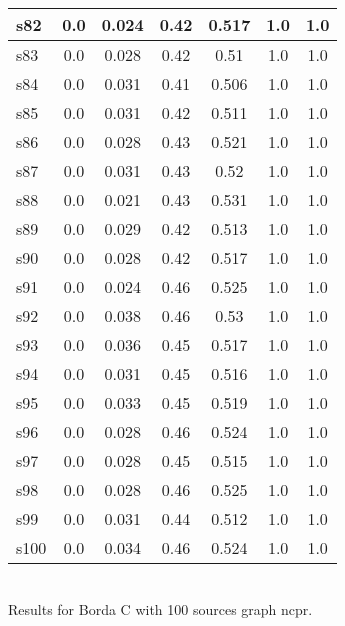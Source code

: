 \documentclass{article}
\begin{document}
\begin{tabular}{|l|c|c|c|c|c|c|}
\hline
s82 &0.0 & 0.024 & 0.42 & 0.517 & 1.0 & 1.0\\
\hline
s83 &0.0 & 0.028 & 0.42 & 0.51 & 1.0 & 1.0\\
\hline
s84 &0.0 & 0.031 & 0.41 & 0.506 & 1.0 & 1.0\\
\hline
s85 &0.0 & 0.031 & 0.42 & 0.511 & 1.0 & 1.0\\
\hline
s86 &0.0 & 0.028 & 0.43 & 0.521 & 1.0 & 1.0\\
\hline
s87 &0.0 & 0.031 & 0.43 & 0.52 & 1.0 & 1.0\\
\hline
s88 &0.0 & 0.021 & 0.43 & 0.531 & 1.0 & 1.0\\
\hline
s89 &0.0 & 0.029 & 0.42 & 0.513 & 1.0 & 1.0\\
\hline
s90 &0.0 & 0.028 & 0.42 & 0.517 & 1.0 & 1.0\\
\hline
s91 &0.0 & 0.024 & 0.46 & 0.525 & 1.0 & 1.0\\
\hline
s92 &0.0 & 0.038 & 0.46 & 0.53 & 1.0 & 1.0\\
\hline
s93 &0.0 & 0.036 & 0.45 & 0.517 & 1.0 & 1.0\\
\hline
s94 &0.0 & 0.031 & 0.45 & 0.516 & 1.0 & 1.0\\
\hline
s95 &0.0 & 0.033 & 0.45 & 0.519 & 1.0 & 1.0\\
\hline
s96 &0.0 & 0.028 & 0.46 & 0.524 & 1.0 & 1.0\\
\hline
s97 &0.0 & 0.028 & 0.45 & 0.515 & 1.0 & 1.0\\
\hline
s98 &0.0 & 0.028 & 0.46 & 0.525 & 1.0 & 1.0\\
\hline
s99 &0.0 & 0.031 & 0.44 & 0.512 & 1.0 & 1.0\\
\hline
s100 &0.0 & 0.034 & 0.46 & 0.524 & 1.0 & 1.0\\
\hline
\end{tabular}\\

\noindent Results for Borda C with 100 sources graph ncpr.
\end{document}

